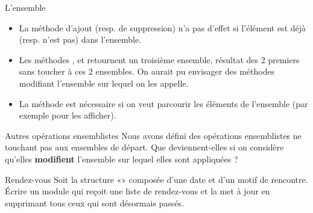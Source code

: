 \begin{Exercice}{L'ensemble}

	\liststyleListv
	\begin{itemize}
		\item 
			La méthode d'ajout (resp. de suppression) n'a
			pas d'effet si l'élément est déjà
			(resp. n'est pas) dans l'ensemble.
		\item 
			Les méthodes , 
			 et 
			 retournent un troisième ensemble, 
			résultat des 2 premiers sans toucher
			à ces 2 ensembles. On aurait pu envisager des méthodes modifiant
			l'ensemble sur lequel on les appelle.
		\item 
			La méthode 
			est nécessaire si on veut parcourir les éléments de
			l'ensemble (par exemple pour les afficher).
	\end{itemize}
\end{Exercice}

\begin{Exercice}{Autres opérations ensemblistes}
	Nous avons défini des opérations ensemblistes ne touchant pas aux
	ensembles de départ. Que deviennent-elles si on considère
	qu'elles \textbf{modifient}
	l'ensemble sur lequel elles sont appliquées ?
\end{Exercice}


\begin{Exercice}{Rendez-vous}
	Soit la structure «» composée d’une date
	et d’un motif de rencontre. Écrire un module qui reçoit une liste de
	rendez-vous et la met à jour en supprimant tous ceux qui sont désormais
	passés. 

\end{Exercice}
